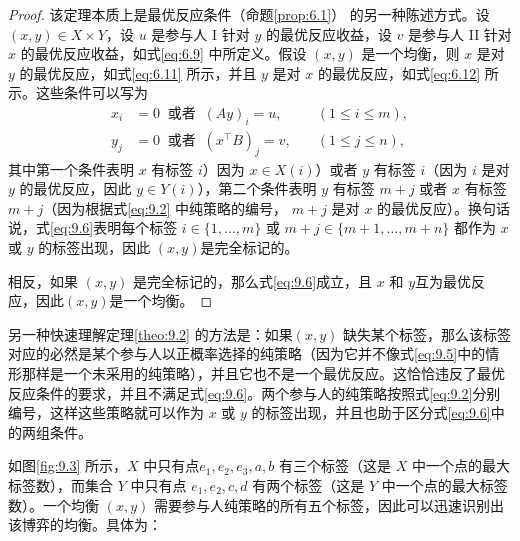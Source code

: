 \begin{proof}
该定理本质上是最优反应条件（命题\ref{prop:6.1}） 的另一种陈述方式。设 \(\left( {x,y}\right)  \in  X \times  Y\)，设 \(u\) 是参与人 I 针对 \(y\) 的最优反应收益，设 \(v\) 是参与人 II 针对 \(x\) 的最优反应收益，如式\eqref{eq:6.9} 中所定义。假设 $(x, y)$ 是一个均衡，则 \(x\) 是对 \(y\) 的最优反应，如式\eqref{eq:6.11} 所示，并且 \(y\) 是对 \(x\) 的最优反应，如式\eqref{eq:6.12} 所示。这些条件可以写为
\begin{equation}\label{eq:9.6}
\begin{aligned}
x_i &= 0 \;\;\text{或者}\;\; (Ay)_i = u, \quad &(1 \le i \le m),\\
y_j &= 0 \;\;\text{或者}\;\; (x^\top B)_j = v, \quad &(1 \le j \le n),
\end{aligned}
\end{equation}
其中第一个条件表明 \(x\) 有标签 \(i\)）因为 \(x \in  X\left( i\right)\)）或者 \(y\) 有标签 \(i\)（因为 \(i\) 是对 \(y\) 的最优反应，因此 \(y \in  Y\left( i\right)\)），第二个条件表明 \(y\) 有标签 \(m + j\) 或者 \(x\) 有标签 \(m + j\)（因为根据式\eqref{eq:9.2} 中纯策略的编号， \(m + j\) 是对 \(x\) 的最优反应）。换句话说，式\eqref{eq:9.6}表明每个标签 \(i \in  \{ 1,\ldots,m\}\) 或 \(m + j \in  \{ m + 1,\ldots,m + n\}\) 都作为 \(x\) 或 \(y\) 的标签出现，因此 $(x, y)$是完全标记的。


相反，如果 $(x, y)$ 是完全标记的，那么式\eqref{eq:9.6}成立，且 \(x\) 和 \(y\)互为最优反应，因此$(x, y)$是一个均衡。
\end{proof}


另一种快速理解定理\ref{theo:9.2} 的方法是：如果$(x, y)$ 缺失某个标签，那么该标签对应的必然是某个参与人以正概率选择的纯策略（因为它并不像式\eqref{eq:9.5}中的情形那样是一个未采用的纯策略），并且它也不是一个最优反应。这恰恰违反了最优反应条件的要求，并且不满足式\eqref{eq:9.6}。两个参与人的纯策略按照式\eqref{eq:9.2}分别编号，这样这些策略就可以作为 \(x\) 或 \(y\) 的标签出现，并且也助于区分式\eqref{eq:9.6}中的两组条件。


如图\ref{fig:9.3} 所示，\(X\) 中只有点\({e}_{1},{e}_{2},{e}_{3},a,b\) 有三个标签（这是 \(X\) 中一个点的最大标签数），而集合 \(Y\) 中只有点 \({e}_{1},{e}_{2},c,d\) 有两个标签（这是 \(Y\) 中一个点的最大标签数）。一个均衡 $(x, y)$ 需要参与人纯策略的所有五个标签，因此可以迅速识别出该博弈的均衡。具体为：

